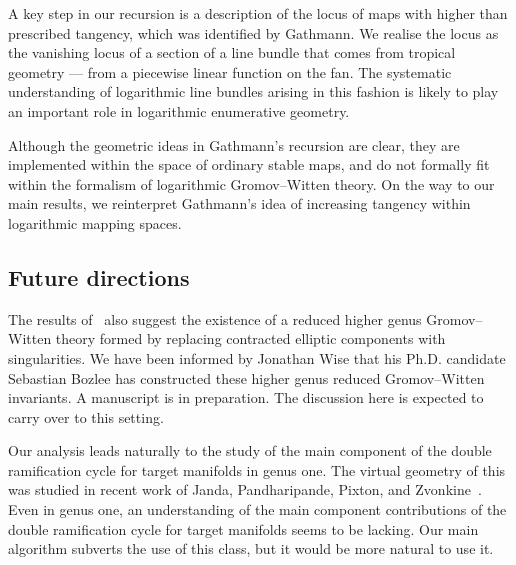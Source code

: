 \documentclass[11pt]{amsart}
\theoremstyle{definition}
\theoremstyle{definition}
\begin{document}
A key step in our recursion is a description of the locus of maps with higher than prescribed tangency, which was identified by Gathmann. We realise the locus as the vanishing locus of a section of a line bundle that comes from tropical geometry — from a piecewise linear function on the fan. The systematic understanding of logarithmic line bundles arising in this fashion is likely to play an important role in logarithmic enumerative geometry. 

Although the geometric ideas in Gathmann's recursion are clear, they are implemented within the space of ordinary stable maps, and do not formally fit within the formalism of logarithmic Gromov--Witten theory. On the way to our main results, we reinterpret Gathmann's idea of increasing tangency within logarithmic mapping spaces. %


\subsection{Future directions} The results of~\cite{RSPW} also suggest the existence of a reduced higher genus Gromov--Witten theory formed by replacing contracted elliptic components with singularities. We have been informed by Jonathan Wise that his Ph.D. candidate Sebastian Bozlee has constructed these higher genus reduced Gromov--Witten invariants. A manuscript is in preparation. The discussion here is expected to carry over to this setting. 

Our analysis leads naturally to the study of the main component of the double ramification cycle for target manifolds in genus one. The virtual geometry of this was studied in recent work of Janda, Pandharipande, Pixton, and Zvonkine~\cite{DRCBundle}. Even in genus one, an understanding of the main component contributions of the double ramification cycle for target manifolds seems to be lacking. Our main algorithm subverts the use of this class, but it would be more natural to use it. 
\end{document}
